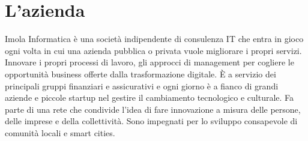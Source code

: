 \section{L'azienda}\label{sec:l'azienda}

Imola Informatica è una società indipendente di consulenza IT che entra in gioco ogni volta in cui una azienda pubblica o privata vuole migliorare i propri servizi.
Innovare i propri processi di lavoro, gli approcci di management per cogliere le opportunità business offerte dalla trasformazione digitale.
È a servizio dei principali gruppi finanziari e assicurativi e ogni giorno è a fianco di grandi aziende e piccole startup nel gestire il cambiamento tecnologico e culturale.
Fa parte di una rete che condivide l'idea di fare innovazione a misura delle persone, delle imprese e della collettività.
Sono impegnati per lo sviluppo consapevole di comunità locali e smart cities.